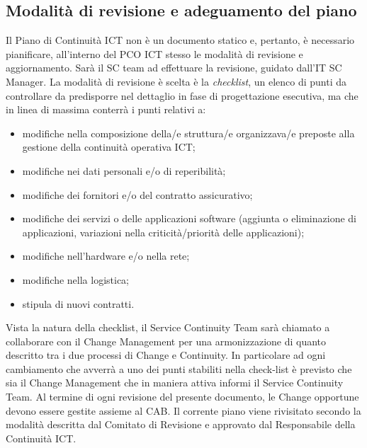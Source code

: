 \subsection{Modalità di revisione e adeguamento del piano}
Il Piano di Continuità ICT non è un documento statico e, pertanto, è necessario pianificare, all’interno del PCO ICT stesso le modalità di revisione e aggiornamento. Sarà il SC team ad effettuare la revisione, guidato dall'IT SC Manager.
La modalità di revisione è scelta è la \textit{checklist}, un elenco di punti da controllare da predisporre nel dettaglio in fase di progettazione esecutiva, ma che in linea di massima conterrà i punti relativi a:
  \begin{itemize}
  \item modifiche nella composizione della/e struttura/e organizzava/e preposte alla gestione della continuità operativa ICT; 
  \item modifiche nei dati personali e/o di reperibilità;
  \item modifiche dei fornitori e/o del contratto assicurativo; 
  \item modifiche dei servizi o delle applicazioni software (aggiunta o eliminazione di applicazioni, 
  variazioni nella criticità/priorità delle applicazioni); 
  \item modifiche nell’hardware e/o nella rete;
  \item modifiche nella logistica; 
  \item stipula di nuovi contratti. 
  \end{itemize}
  Vista la natura della checklist, il Service Continuity Team sarà chiamato a collaborare con il Change Management per una armonizzazione di quanto descritto tra i due processi di Change e Continuity. In particolare ad ogni cambiamento che avverrà a uno dei punti stabiliti nella check-list è previsto che sia il Change Management che in maniera attiva informi il Service Continuity Team. Al termine di ogni revisione del presente documento, le Change opportune devono essere gestite assieme al CAB.
Il corrente piano viene rivisitato secondo la modalità descritta dal Comitato di Revisione e approvato dal Responsabile della Continuità ICT.